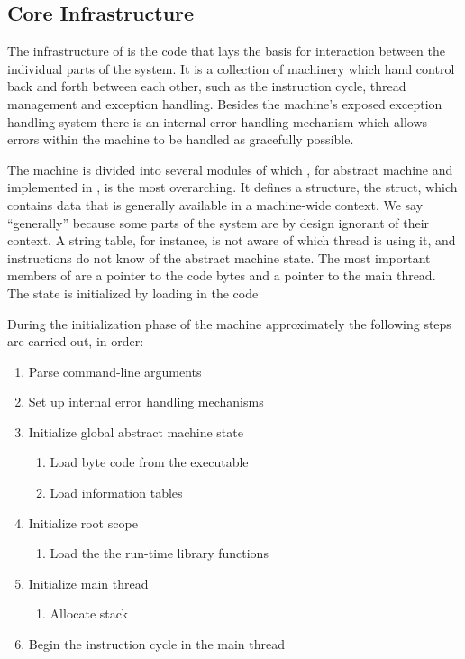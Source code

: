 \subsection{Core Infrastructure}
\label{sec:implementation:core}



The infrastructure of \thename{} is the code that lays the basis for interaction
between the individual parts of the system. It is a collection of machinery
which hand control back and forth between each other, such as the instruction
cycle, thread management and exception handling. Besides the machine's exposed
exception handling system there is an internal error handling mechanism which
allows errors within the machine to be handled as gracefully possible.

The machine is divided into several modules of which , for abstract
machine and implemented in , is the most overarching. It defines a
structure, the  struct, which contains data that is generally
available in a machine-wide context. We say ``generally'' because some parts of
the system are by design ignorant of their context. A string table, for
instance, is not aware of which thread is using it, and instructions do not know
of the abstract machine state. The most important members of 
are a pointer to the code bytes and a pointer to the main thread. The state is
initialized by loading in the code %

During the initialization phase of the machine approximately the following steps
are carried out, in order: %

\begin{enumerate}
\item Parse command-line arguments
\item Set up internal error handling mechanisms
\item Initialize global abstract machine state
  \begin{enumerate}
  \item Load byte code from the executable
  \item Load information tables %
  \end{enumerate}
\item Initialize root scope
  \begin{enumerate}
  \item Load the the run-time library functions
  \end{enumerate}
\item Initialize main thread
  \begin{enumerate}
  \item Allocate stack
  \end{enumerate}
\item Begin the instruction cycle in the main thread
\end{enumerate}


